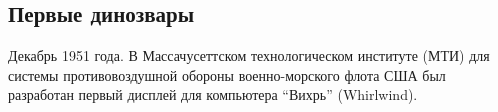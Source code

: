 \documentclass[10pt]{beamer}
\begin{document}
	\subsection{Первые динозвары}
	
	\frame{\subsectionpage}
	
	{
		Декабрь 1951 года. В Массачусеттском технологическом институте (МТИ) для системы противовоздушной обороны военно-морского флота США был разработан первый дисплей для компьютера “Вихрь” (Whirlwind).		
		\begin{columns}[T]
			\begin{column}{0.5\textwidth}					
			\end{column}
			\begin{column}{0.5\textwidth}
			\end{column}
		\end{columns}
		


	}
	
\renewcommand\UrlFont{\color{red}\rmfamily\itshape}	
\end{document}
